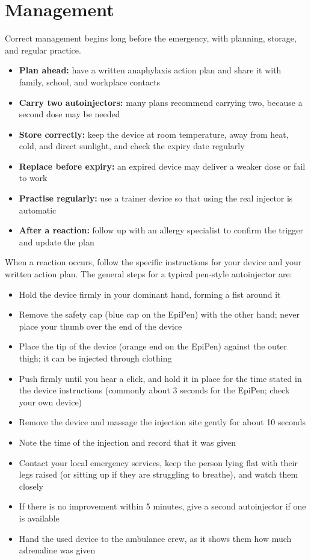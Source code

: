 \section*{Management}
Correct management begins long before the emergency, with planning, storage, and regular practice.

\begin{itemize}
    \item \textbf{Plan ahead:} have a written anaphylaxis action plan and share it with family, school, and workplace contacts
    \item \textbf{Carry two autoinjectors:} many plans recommend carrying two, because a second dose may be needed
    \item \textbf{Store correctly:} keep the device at room temperature, away from heat, cold, and direct sunlight, and check the expiry date regularly
    \item \textbf{Replace before expiry:} an expired device may deliver a weaker dose or fail to work
    \item \textbf{Practise regularly:} use a trainer device so that using the real injector is automatic
    \item \textbf{After a reaction:} follow up with an allergy specialist to confirm the trigger and update the plan
\end{itemize}

When a reaction occurs, follow the specific instructions for your device and your written action plan. The general steps for a typical pen-style autoinjector are:

\begin{itemize}
    \item Hold the device firmly in your dominant hand, forming a fist around it
    \item Remove the safety cap (blue cap on the EpiPen) with the other hand; never place your thumb over the end of the device
    \item Place the tip of the device (orange end on the EpiPen) against the outer thigh; it can be injected through clothing
    \item Push firmly until you hear a click, and hold it in place for the time stated in the device instructions (commonly about 3 seconds for the EpiPen; check your own device)
    \item Remove the device and massage the injection site gently for about 10 seconds
    \item Note the time of the injection and record that it was given
    \item Contact your local emergency services, keep the person lying flat with their legs raised (or sitting up if they are struggling to breathe), and watch them closely
    \item If there is no improvement within 5 minutes, give a second autoinjector if one is available
    \item Hand the used device to the ambulance crew, as it shows them how much adrenaline was given
\end{itemize}


